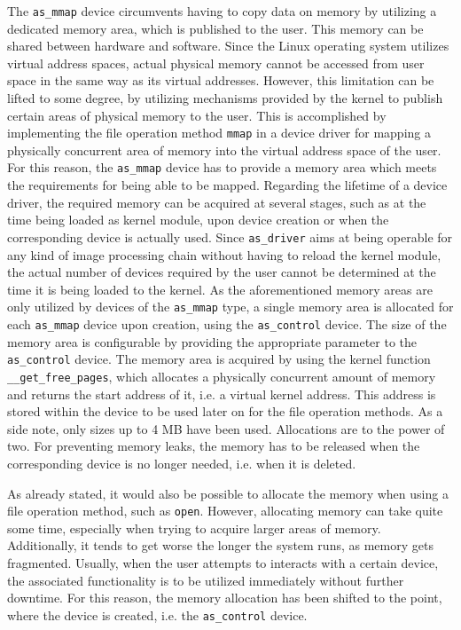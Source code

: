 The \texttt{as\_mmap} device circumvents having to copy data on memory by utilizing a dedicated memory area, which is published to the user. 
This memory can be shared between hardware and software.
Since the Linux operating system utilizes virtual address spaces, actual physical memory cannot be accessed from user space in the same way as its virtual addresses.
However, this limitation can be lifted to some degree, by utilizing mechanisms provided by the kernel to publish certain areas of physical memory to the user.
This is accomplished by implementing the file operation method \texttt{mmap} in a device driver for mapping a physically concurrent area of memory into the virtual address space of the user.
For this reason, the \texttt{as\_mmap} device has to provide a memory area which meets the requirements for being able to be mapped.
Regarding the lifetime of a device driver, the required memory can be acquired at several stages, such as at the time being loaded as kernel module, upon device creation or when the corresponding device is actually used.
Since \texttt{as\_driver} aims at being operable for any kind of image processing chain without having to reload the kernel module, the actual number of devices required by the user cannot be determined at the time it is being loaded to the kernel.
As the aforementioned memory areas are only utilized by devices of the \texttt{as\_mmap} type, a single memory area is allocated for each \texttt{as\_mmap} device upon creation, using the \texttt{as\_control} device.
The size of the memory area is configurable by providing the appropriate parameter to the \texttt{as\_control} device.
The memory area is acquired by using the kernel function \texttt{\_\_get\_free\_pages}, which allocates a physically concurrent amount of memory and returns the start address of it, i.e. a virtual kernel address.
This address is stored within the device to be used later on for the file operation methods.
As a side note, only sizes up to 4 MB have been used.
Allocations are to the power of two.
For preventing memory leaks, the memory has to be released when the corresponding device is no longer needed, i.e. when it is deleted.

As already stated, it would also be possible to allocate the memory when using a file operation method, such as \texttt{open}.
However, allocating memory can take quite some time, especially when trying to acquire larger areas of memory.
Additionally, it tends to get worse the longer the system runs, as memory gets fragmented.
Usually, when the user attempts to interacts with a certain device, the associated functionality is to be utilized immediately without further downtime.
For this reason, the memory allocation has been shifted to the point, where the device is created, i.e. the \texttt{as\_control} device.


